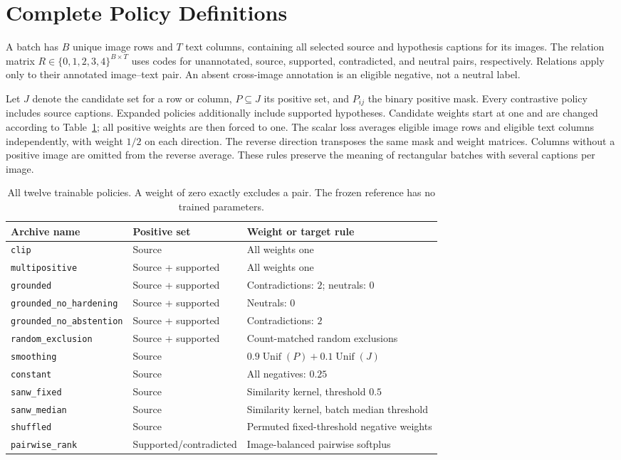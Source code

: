 \section{Complete Policy Definitions}
\label{app:policies}
A batch has $B$ unique image rows and $T$ text columns, containing all selected source and hypothesis captions for its images. The relation matrix $R\in\{0,1,2,3,4\}^{B\times T}$ uses codes for unannotated, source, supported, contradicted, and neutral pairs, respectively. Relations apply only to their annotated image--text pair. An absent cross-image annotation is an eligible negative, not a neutral label.

Let $J$ denote the candidate set for a row or column, $P\subseteq J$ its positive set, and $P_{ij}$ the binary positive mask. Every contrastive policy includes source captions. Expanded policies additionally include supported hypotheses. Candidate weights start at one and are changed according to Table~\ref{tab:policies}; all positive weights are then forced to one. The scalar loss averages eligible image rows and eligible text columns independently, with weight $1/2$ on each direction. The reverse direction transposes the same mask and weight matrices. Columns without a positive image are omitted from the reverse average. These rules preserve the meaning of rectangular batches with several captions per image.

\begin{table}[t]
\centering
\setlength{\tabcolsep}{3.5pt}
\begin{tabular}{lll}
\toprule
Archive name & Positive set & Weight or target rule\\
\midrule
\texttt{clip} & Source & All weights one\\
\texttt{multipositive} & Source + supported & All weights one\\
\texttt{grounded} & Source + supported & Contradictions: $2$; neutrals: $0$\\
\texttt{grounded\_no\_hardening} & Source + supported & Neutrals: $0$\\
\texttt{grounded\_no\_abstention} & Source + supported & Contradictions: $2$\\
\texttt{random\_exclusion} & Source + supported & Count-matched random exclusions\\
\texttt{smoothing} & Source & $0.9\operatorname{Unif}(P)+0.1\operatorname{Unif}(J)$\\
\texttt{constant} & Source & All negatives: $0.25$\\
\texttt{sanw\_fixed} & Source & Similarity kernel, threshold $0.5$\\
\texttt{sanw\_median} & Source & Similarity kernel, batch median threshold\\
\texttt{shuffled} & Source & Permuted fixed-threshold negative weights\\
\texttt{pairwise\_rank} & Supported/contradicted & Image-balanced pairwise softplus\\
\bottomrule
\end{tabular}
\caption{All twelve trainable policies. A weight of zero exactly excludes a pair. The frozen reference has no trained parameters.}
\label{tab:policies}
\end{table}

